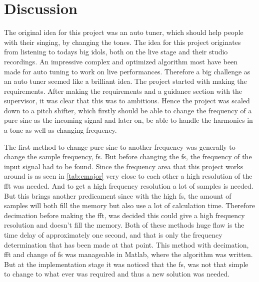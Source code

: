 
\chapter{Discussion}

The original idea for this project was an auto tuner, which should help people with their singing, by changing the tones.
The idea for this project originates from listening to todays big idols, both on the live stage and their studio recordings. 
An impressive complex and optimized algorithm most have been made for auto tuning to work on live performances. 
Therefore a big challenge as an auto tuner seemed like a brilliant idea. 
The project started with making the requirements. 
After making the requirements and a guidance section with the supervisor, it was clear that this was to ambitious. 
Hence the project was scaled down to a pitch shifter, which firstly should be able to change the frequency of a pure sine as the incoming signal and later on, be able to handle the harmonics in a tone as well as changing frequency.

The first method to change pure sine to another frequency was generally to change the sample frequency, fs. 
But before changing the fs, the frequency of the input signal had to be found. 
Since the frequency area that this project works around is as seen in \cref{tab:cmajor} very close to each other a high resolution of the fft was needed. 
And to get a high frequency resolution a lot of samples is needed. 
But this brings another predicament since with the high fs, the amount of samples will both fill the memory but also use a lot of calculation time. 
Therefore decimation before making the fft, was decided this could give a high frequency resolution and doesn't fill the memory. 
Both of these methods huge flaw is the time delay of approximately one second, and that is only the frequency determination that has been made at that point. 
This method with decimation, fft and change of fs was manageable in Matlab, where the algorithm was written. 
But at the implementation stage it was noticed that the fs, was not that simple to change to what ever was required and thus a new solution was needed. 


